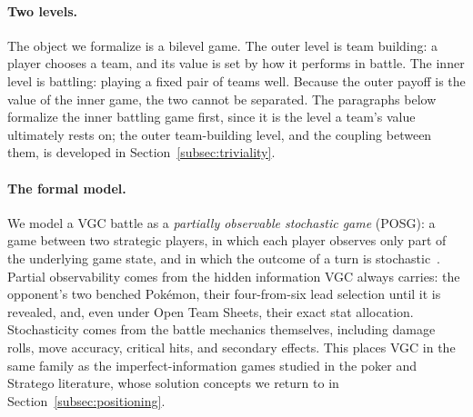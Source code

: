 \paragraph{Two levels.}
The object we formalize is a bilevel game. The outer level is team building: a
player chooses a team, and its value is set by how it performs in battle. The
inner level is battling: playing a fixed pair of teams well. Because the outer
payoff is the value of the inner game, the two cannot be separated. The paragraphs
below formalize the inner battling game first, since it is the level a team's
value ultimately rests on; the outer team-building level, and the coupling between
them, is developed in Section~\ref{subsec:triviality}.
\paragraph{The formal model.}
We model a VGC battle as a \emph{partially observable stochastic game} (POSG):
a game between two strategic players, in which each player observes only part of
the underlying game state, and in which the outcome of a turn is
stochastic~\cite{karten2025pokeagent,perolat2022deepnash}. Partial observability
comes from the hidden information VGC always carries: the opponent's two benched
Pok\'{e}mon, their four-from-six lead selection until it is revealed, and, even
under Open Team Sheets, their exact stat allocation. Stochasticity comes from the
battle mechanics themselves, including damage rolls, move accuracy, critical hits,
and secondary effects. This places VGC in the same family as the
imperfect-information games studied in the poker and Stratego literature, whose
solution concepts we return to in Section~\ref{subsec:positioning}.
